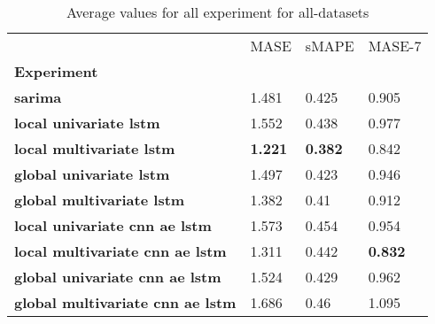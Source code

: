 \begin{table}[H]
\centering
\caption{Average values for all experiment for all-datasets}
\label{table:Average-metric-all-datasets}
\begin{tabular}{llll}
\toprule
{} &            MASE &           sMAPE &          MASE-7 \\
\textbf{Experiment                     } &                 &                 &                 \\
\midrule
\textbf{sarima                         } &           1.481 &           0.425 &           0.905 \\
\textbf{local univariate lstm          } &           1.552 &           0.438 &           0.977 \\
\textbf{local multivariate lstm        } &  \textbf{1.221} &  \textbf{0.382} &           0.842 \\
\textbf{global univariate lstm         } &           1.497 &           0.423 &           0.946 \\
\textbf{global multivariate lstm       } &           1.382 &            0.41 &           0.912 \\
\textbf{local univariate cnn ae lstm   } &           1.573 &           0.454 &           0.954 \\
\textbf{local multivariate cnn ae lstm } &           1.311 &           0.442 &  \textbf{0.832} \\
\textbf{global univariate cnn ae lstm  } &           1.524 &           0.429 &           0.962 \\
\textbf{global multivariate cnn ae lstm} &           1.686 &            0.46 &           1.095 \\
\bottomrule
\end{tabular}
\end{table}
